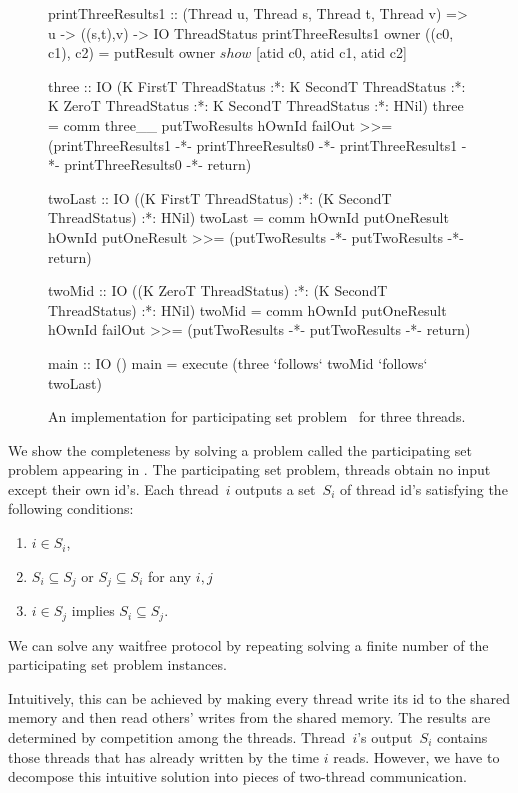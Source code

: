 \begin{figure*}[t]
\begin{spec}
printThreeResults1 :: (Thread u, Thread s, Thread t, Thread v) => u -> ((s,t),v) -> IO ThreadStatus
printThreeResults1 owner ((c0, c1), c2) = putResult owner $ show $ [atid c0, atid c1, atid c2]

three :: IO (K FirstT ThreadStatus :*: K SecondT ThreadStatus :*:
             K ZeroT  ThreadStatus :*: K SecondT ThreadStatus :*: HNil)
three = comm three__ putTwoResults hOwnId failOut
   >>= (printThreeResults1 -*- printThreeResults0 -*- printThreeResults1 -*- printThreeResults0 -*- return)

twoLast :: IO ((K FirstT ThreadStatus) :*: (K SecondT ThreadStatus) :*: HNil)
twoLast = comm hOwnId putOneResult hOwnId putOneResult >>= (putTwoResults -*- putTwoResults -*- return)

twoMid :: IO ((K ZeroT ThreadStatus) :*: (K SecondT ThreadStatus) :*: HNil)
twoMid = comm hOwnId putOneResult hOwnId failOut >>= (putTwoResults -*- putTwoResults -*- return)

main :: IO ()
main = execute (three `follows` twoMid `follows` twoLast)

\end{spec}
 \caption{An implementation for participating set problem~\citep{participating} for three
 threads.}
 \label{fig:complete}
\end{figure*}


We show the completeness by solving a problem called
the participating set problem appearing in \citet{participating}.
The participating set problem, threads obtain no input except their own
id's.
Each thread~$i$ outputs a set~$S_i$ of thread id's satisfying the
following conditions:
\begin{enumerate}
 \item $i\in S_i$,
 \item $S_i\subseteq S_j$ or $S_j\subseteq S_i$ for any $i,j$
 \item $i\in S_j$ implies $S_i\subseteq S_j$.
\end{enumerate}
We can solve any waitfree protocol by repeating solving a finite number
of the participating set problem instances.

Intuitively, this can be achieved by making every thread write its id to
the shared memory and then read others' writes from the shared memory.
The results are determined by competition among the threads.
Thread~$i$'s output~$S_i$ contains those threads that has already
written by the time $i$ reads.
However, we have to decompose this intuitive solution into pieces of
two-thread communication.


